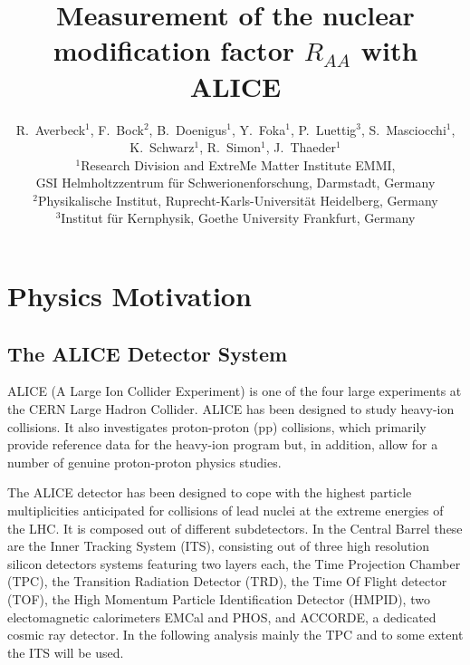 \documentclass{article}
\begin{document}
\title{Measurement of the nuclear modification factor $R_{AA}$ with ALICE}
\author{R.~Averbeck$^1$, F.~Bock$^2$, B.~Doenigus$^1$, Y.~Foka$^1$, 
        P.~Luettig$^3$, S.~Masciocchi$^1$,\\
        K.~Schwarz$^1$, R.~Simon$^1$, J.~Thaeder$^1$\\
\normalsize $^1$Research Division and ExtreMe Matter Institute EMMI,\\
\normalsize GSI Helmholtzzentrum f\"ur Schwerionenforschung, Darmstadt, Germany\\
\normalsize $^2$Physikalische Institut, Ruprecht-Karls-Universit\"at
\normalsize Heidelberg, Germany\\
\normalsize $^3$Institut f\"ur Kernphysik, Goethe University
\normalsize Frankfurt, Germany
}
\maketitle

\tableofcontents

\newpage
\section{Physics Motivation}
\subsection{The ALICE Detector System}
ALICE (A Large Ion Collider Experiment) is one of the four large experiments 
at the CERN Large Hadron Collider. ALICE has been designed to study heavy-ion 
collisions. It also investigates proton-proton (pp) collisions, which primarily
provide reference data for the heavy-ion program but, in addition, allow for a 
number of genuine proton-proton physics studies.

The ALICE detector has been designed to cope with the highest particle 
multiplicities anticipated for collisions of lead nuclei at the extreme 
energies of the LHC. It is composed out of different subdetectors. 
In the Central Barrel these are the Inner Tracking System (ITS), consisting 
out of three high resolution silicon detectors systems featuring two layers 
each, the Time Projection Chamber (TPC), the Transition Radiation Detector 
(TRD), the Time Of Flight detector (TOF), the High Momentum Particle 
Identification Detector (HMPID), two electomagnetic calorimeters EMCal and 
PHOS, and ACCORDE, a dedicated cosmic ray detector. In the following analysis 
mainly the TPC and to some extent the ITS will be used. 
\end{document}
